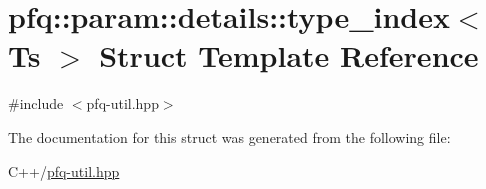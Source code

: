 \hypertarget{structpfq_1_1param_1_1details_1_1type__index}{\section{pfq\+:\+:param\+:\+:details\+:\+:type\+\_\+index$<$ Ts $>$ Struct Template Reference}
\label{structpfq_1_1param_1_1details_1_1type__index}
}


{\ttfamily \#include $<$pfq-\/util.\+hpp$>$}



The documentation for this struct was generated from the following file\+:\begin{DoxyCompactItemize}
\item 
C++/\hyperlink{pfq-util_8hpp}{pfq-\/util.\+hpp}\end{DoxyCompactItemize}
